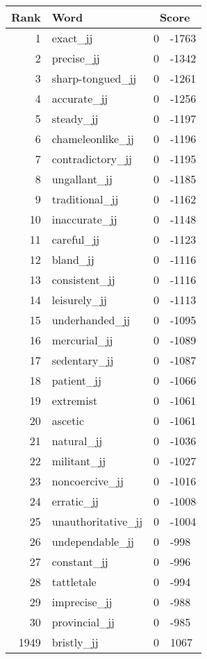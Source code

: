 \begin{longtable}[!htbp]{| rlr@{.}l |}
    \hline
    \textbf{Rank} & \textbf{Word} & \multicolumn{2}{c|}{\textbf{Score}} \\
    \hline
    \endhead
    1 & exact\_jj & 0 & -1763 \\
    2 & precise\_jj & 0 & -1342 \\
    3 & sharp-tongued\_jj & 0 & -1261 \\
    4 & accurate\_jj & 0 & -1256 \\
    5 & steady\_jj & 0 & -1197 \\
    6 & chameleonlike\_jj & 0 & -1196 \\
    7 & contradictory\_jj & 0 & -1195 \\
    8 & ungallant\_jj & 0 & -1185 \\
    9 & traditional\_jj & 0 & -1162 \\
    10 & inaccurate\_jj & 0 & -1148 \\
    11 & careful\_jj & 0 & -1123 \\
    12 & bland\_jj & 0 & -1116 \\
    13 & consistent\_jj & 0 & -1116 \\
    14 & leisurely\_jj & 0 & -1113 \\
    15 & underhanded\_jj & 0 & -1095 \\
    16 & mercurial\_jj & 0 & -1089 \\
    17 & sedentary\_jj & 0 & -1087 \\
    18 & patient\_jj & 0 & -1066 \\
    19 & extremist & 0 & -1061 \\
    20 & ascetic & 0 & -1061 \\
    21 & natural\_jj & 0 & -1036 \\
    22 & militant\_jj & 0 & -1027 \\
    23 & noncoercive\_jj & 0 & -1016 \\
    24 & erratic\_jj & 0 & -1008 \\
    25 & unauthoritative\_jj & 0 & -1004 \\
    26 & undependable\_jj & 0 & -998 \\
    27 & constant\_jj & 0 & -996 \\
    28 & tattletale & 0 & -994 \\
    29 & imprecise\_jj & 0 & -988 \\
    30 & provincial\_jj & 0 & -985 \\
    1949 & bristly\_jj & 0 & 1067 \\

\end{longtable}
